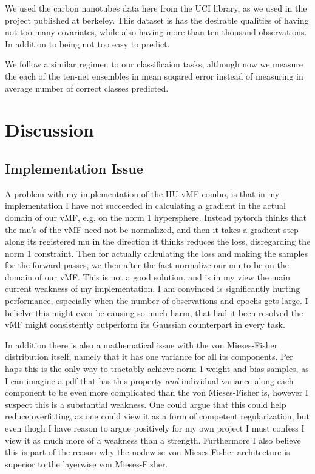 \documentclass[nofootinbib,UKenglish,nobalancelastpage,12pt]{article}
\begin{document}
We used the carbon nanotubes data here from the UCI library, as we used in the project published at berkeley.\cite{CarbonNanotubes} This dataset is has the desirable qualities of having not too many covariates, while also having more than ten thousand observations. In addition to being not too easy to predict. 

We follow a similar regimen to our classificaion tasks, although now we measure the each of the ten-net ensembles in mean suqared error instead of measuring in average number of correct classes predicted.
\clearpage
\section{Discussion}

\subsection{Implementation Issue}
A problem with my implementation of the HU-vMF combo, is that in my implementation I have not succeeded in calculating a gradient in the actual domain of our vMF, e.g. on the norm 1 hypersphere. Instead pytorch thinks that the mu's of the vMF need not be normalized, and then it takes a gradient step along its registered mu in the direction it thinks reduces the loss, disregarding the norm 1 constraint. Then for actually calculating the loss and making the samples for the forward passes, we then after-the-fact normalize our mu to be on the domain of our vMF. This is not a good solution, and is in my view the main current weakness of my implementation. I am convinced is significantly hurting performance, especially when the number of observations and epochs gets large. I belielve this might even be causing so much harm, that had it been resolved the vMF might consistently outperform its Gaussian counterpart in every task.

In addition there is also a mathematical issue with the von Mieses-Fisher distribution itself, namely that it has one variance for all its components. Per haps this is the only way to tractably achieve norm 1 weight and bias samples, as I can imagine a pdf that has this property \textit{and} individual variance along each component to be even more complicated than the von Mieses-Fisher is, however I suspect this is a substantial weakness. One could argue that this could help reduce overfitting, as one could view it as a form of competent regularization, but even thogh I have reason to argue positively for my own project I must confess I view it as much more of a weakness than a strength. Furthermore I also believe this is part of the reason why the nodewise von Mieses-Fisher architecture is superior to the layerwise von Mieses-Fisher. 
\clearpage


\end{document}
